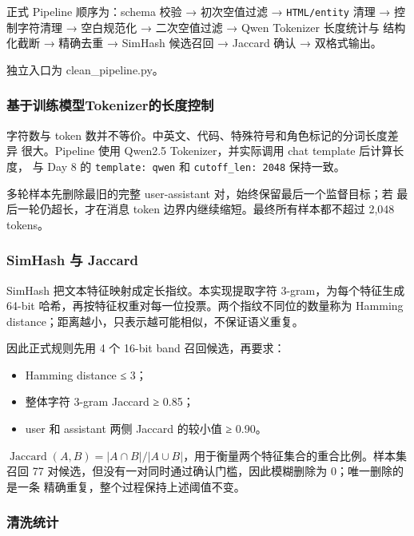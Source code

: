 \documentclass[UTF8,fontset=fandol,a4paper,11pt]{ctexart}
\providecommand{\tightlist}{\setlength{\itemsep}{0pt}\setlength{\parskip}{0pt}}
\begin{document}
正式 Pipeline 顺序为：schema 校验 → 初次空值过滤 →
{\nolinkurl{HTML/entity}} 清理 → 控制字符清理 → 空白规范化 →
二次空值过滤 → Qwen Tokenizer 长度统计与 结构化截断 → 精确去重 → SimHash
候选召回 → Jaccard 确认 → 双格式输出。

独立入口为 clean\_pipeline.py。

\subsubsection{基于训练模型Tokenizer的长度控制}\label{ux57faux4e8eux8badux7ec3ux6a21ux578btokenizerux7684ux957fux5ea6ux63a7ux5236}

字符数与 token
数并不等价。中英文、代码、特殊符号和角色标记的分词长度差异
很大。Pipeline 使用 Qwen2.5 Tokenizer，并实际调用 chat template
后计算长度， 与 Day 8 的 \nolinkurl{template: qwen} 和
\nolinkurl{cutoff_len: 2048} 保持一致。

多轮样本先删除最旧的完整 user-assistant 对，始终保留最后一个监督目标；若
最后一轮仍超长，才在消息 token 边界内继续缩短。最终所有样本都不超过
2,048 tokens。

\subsubsection{SimHash 与 Jaccard}\label{simhash-ux4e0e-jaccard}

SimHash 把文本特征映射成定长指纹。本实现提取字符 3-gram，为每个特征生成
64-bit 哈希，再按特征权重对每一位投票。两个指纹不同位的数量称为 Hamming
distance；距离越小，只表示越可能相似，不保证语义重复。

因此正式规则先用 4 个 16-bit band 召回候选，再要求：

\begin{itemize}
\tightlist
\item
  Hamming distance ≤ 3；
\item
  整体字符 3-gram Jaccard ≥ 0.85；
\item
  user 和 assistant 两侧 Jaccard 的较小值 ≥ 0.90。
\end{itemize}

\(\operatorname{Jaccard}(A,B)=|A\cap B|/|A\cup B|\)，用于衡量两个特征集合的重合比例。样本集召回
77 对候选，但没有一对同时通过确认门槛，因此模糊删除为
0；唯一删除的是一条 精确重复，整个过程保持上述阈值不变。

\Needspace{270pt}

\subsubsection{清洗统计}\label{ux6e05ux6d17ux7edfux8ba1}
\end{document}
